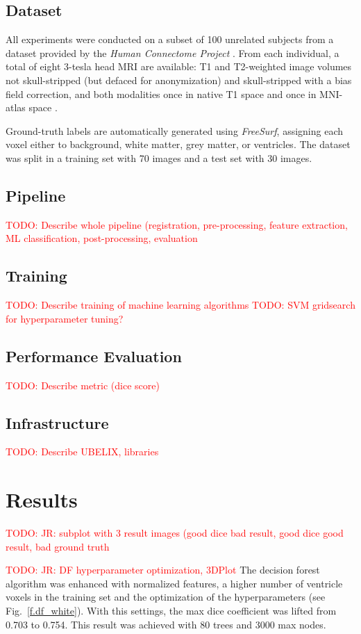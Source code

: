 \documentclass[journal]{IEEEtran}
\newcommand\TODO[1]{\textcolor{red}{TODO: #1}}
\begin{document}
\subsection{Dataset}
All experiments were conducted on a subset of 100 unrelated subjects from a dataset provided by the \textit{Human Connectome Project} \cite{van2013wu}. From each individual, a total of eight 3-tesla head MRI are available: T1 and T2-weighted image volumes not skull-stripped (but defaced for anonymization) and skull-stripped with a bias field correction, and both modalities once in native T1 space and once in MNI-atlas space \cite{mazziotta2001probabilistic}.

Ground-truth labels are automatically generated using \textit{FreeSurf}, assigning each voxel either to background, white matter, grey matter, or ventricles. The dataset was split in a training set with 70 images and a test set with 30 images.
\subsection{Pipeline}
\TODO{Describe whole pipeline (registration, pre-processing, feature extraction, ML classification, post-processing, evaluation}

\subsection{Training}
\TODO{Describe training of machine learning algorithms}
\TODO{SVM gridsearch for hyperparameter tuning?}

\subsection{Performance Evaluation}
\TODO{Describe metric (dice score)}

\subsection{Infrastructure}
\TODO{Describe UBELIX, libraries}


\section{Results}
\TODO{JR: subplot with 3 result images (good dice bad result, good dice good result, bad ground truth}


\TODO{JR: DF hyperparameter optimization, 3DPlot}
The decision forest algorithm was enhanced with normalized features, a higher number of ventricle voxels in the training set and the optimization of the hyperparameters (see Fig.~\ref{f.df_white}). With this settings, the max dice coefficient was lifted from 0.703 to 0.754. This result was achieved with 80 trees and 3000 max nodes.
\end{document}

